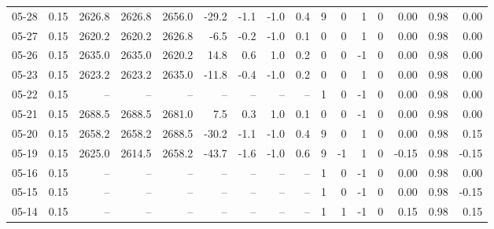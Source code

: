 \begin{threeparttable}
{\begin{tabular}{lrrrrrrrrrrrrrrr}
  05-28 &     0.15 & 2626.8 & 2626.8 & 2656.0 &      -29.2 &           -1.1 &                     -1.0 &                 0.4 &              9 &         0 &     1 &         0 &       0.00 &      0.98 &           0.00 \\
  05-27 &     0.15 & 2620.2 & 2620.2 & 2626.8 &       -6.5 &           -0.2 &                     -1.0 &                 0.1 &              0 &         0 &     1 &         0 &       0.00 &      0.98 &           0.00 \\
  05-26 &     0.15 & 2635.0 & 2635.0 & 2620.2 &       14.8 &            0.6 &                      1.0 &                 0.2 &              0 &         0 &    -1 &         0 &       0.00 &      0.98 &           0.00 \\
  05-23 &     0.15 & 2623.2 & 2623.2 & 2635.0 &      -11.8 &           -0.4 &                     -1.0 &                 0.2 &              0 &         0 &     1 &         0 &       0.00 &      0.98 &           0.00 \\
  05-22 &     0.15 &     -- &     -- &     -- &         -- &             -- &                       -- &                  -- &              1 &         0 &    -1 &         0 &       0.00 &      0.98 &           0.00 \\
  05-21 &     0.15 & 2688.5 & 2688.5 & 2681.0 &        7.5 &            0.3 &                      1.0 &                 0.1 &              0 &         0 &    -1 &         0 &       0.00 &      0.98 &           0.00 \\
  05-20 &     0.15 & 2658.2 & 2658.2 & 2688.5 &      -30.2 &           -1.1 &                     -1.0 &                 0.4 &              9 &         0 &     1 &         0 &       0.00 &      0.98 &           0.15 \\
  05-19 &     0.15 & 2625.0 & 2614.5 & 2658.2 &      -43.7 &           -1.6 &                     -1.0 &                 0.6 &              9 &        -1 &     1 &         0 &      -0.15 &      0.98 &          -0.15 \\
  05-16 &     0.15 &     -- &     -- &     -- &         -- &             -- &                       -- &                  -- &              1 &         0 &    -1 &         0 &       0.00 &      0.98 &           0.00 \\
  05-15 &     0.15 &     -- &     -- &     -- &         -- &             -- &                       -- &                  -- &              1 &         0 &    -1 &         0 &       0.00 &      0.98 &          -0.15 \\
  05-14 &     0.15 &     -- &     -- &     -- &         -- &             -- &                       -- &                  -- &              1 &         1 &    -1 &         0 &       0.15 &      0.98 &           0.15 \\

\end{tabular}}
\end{threeparttable}
